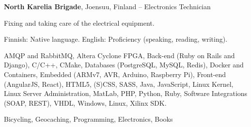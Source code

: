 \documentclass[letterpaper,MMMyyyy,nonstopmode]{simpleresumecv}
\begin{document}
\begin{Body}
\BigGap
\Entry
\textbf{North Karelia Brigade}, Joensuu, Finland
\hfill
{} -- 
\Gap
\BulletItem Electronics Technician
\begin{Detail}
    \SubBulletItem Fixing and taking care of the electrical equipment.
\end{Detail}

\newpage



\BulletItem Finnish: Native language.
\Gap
\BulletItem English: Proficiency (speaking, reading, writing).



\Entry
\BulletItem AMQP and RabbitMQ,
\BulletItem Altera Cyclone FPGA,
\BulletItem Back-end (Ruby on Rails and Django),
\BulletItem C/C++,
\BulletItem CMake,
\BulletItem Databases (PostgreSQL, MySQL, Redis),
\BulletItem Docker and Containers,
\BulletItem Embedded (ARMv7, AVR, Arduino, Raspberry Pi),
\BulletItem Front-end (AngularJS, React),
\BulletItem HTML5, (S)CSS, SASS,
\BulletItem Java,
\BulletItem JavaScript,
\BulletItem Linux Kernel,
\BulletItem Linux Server Administration,
\BulletItem MatLab,
\BulletItem PHP,
\BulletItem Python,
\BulletItem Ruby,
\BulletItem Software Integrations (SOAP, REST),
\BulletItem VHDL,
\BulletItem Windows, Linux,
\BulletItem Xilinx SDK.



\Entry
Bicycling, Geocaching, Programming, Electronics, Books

\end{Body}
\end{document}
